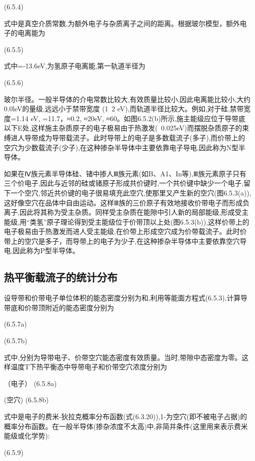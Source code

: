  	(6.5.4)

式中是真空介质常数,为额外电子与杂质离子之间的距离。根据玻尔模型，额外电子的电离能为

	(6.5.5)

式中=-13.6eV,为氢原子电离能,第一轨道半径为

 	(6.5.6)

玻尔半径。一般半导体的介电常数比较大,有效质量比较小,因此电离能比较小,大约0.0leV的量级,远远小于禁带宽度 (1~2 eV),而轨道半径比较大。例如,对于硅,禁带宽度=1.14 eV, =11.7，≈0.2, ≈20eV, ≈60。如图6.5.2(b)所示,施主能级应位于导带底以下E处,这样施主杂质原子的电子极易由于热激发(~0.025eV)而摆脱杂质原子的束缚进人导带成为导带载流子。此时导带上的电子是多数载流子(多子),而价带上的空穴为少数载流子(少子),在这种掺杂半导体中主要依靠电子导电,因此称为N型半导体。



如果在Ⅳ族元素半导体硅、锗中掺人Ⅲ族元素(如B、A1、In等),Ⅲ族元素原子只有三个价电子,因此与近邻的硅或锗原子形成共价键时,一个共价键中缺少一个电子,留下一个空穴,邻近共价键的电子很易填充此空穴,使那里又产生新的空穴(图6.5.3(a)),这好像空穴在品体中自由运动。这样Ⅲ族的三价原子有效地接收价带电子而形成负离子,因此将其称为受主杂质。同样受主杂质在能隙中引人新的局部能级,形成受主能级,用“类氢”原子理论得到受主能级位于价带顶以上处(图6.5.3(b)),这样价带上的电子极易由于热激发而进人受主能级,在价带上形成空穴成为价带载流子。此时价带上的空穴是多子，而导带上的电子为少子,在这种掺杂半导体中主要依靠空穴导电,因此称为P型半导体。



\subsection{热平衡载流子的统计分布}

设导带和价带电子单位体积的能态密度分别为和,利用等能面方程式(6.5.3),计算导带底和价带顶附近的能态密度分别为

 	(6.5.7a)

 	(6.5.7b)



式中,分别为导带电子、价带空穴能态密度有效质量。当时,带隙中态密度为零。这样温度T下热平衡态中导带电子和价带空穴浓度分别为

 （电子）	(6.5.8a)

 (空穴)	(6.5.8b)

式中是电子的费米-狄拉克概率分布函数(式(6.3.20)),1-为空穴(即不被电子占据)的概率分布函数。在一般半导体(掺杂浓度不太高)中,非简并条件(这里用来表示费米能级或化学势):

 	(6.5.9)

